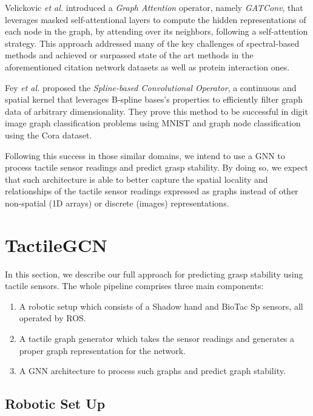 Velickovic \emph{et al.} \cite{Velickovic2017} introduced a \emph{Graph Attention} operator, namely \emph{GATConv}, that leverages masked self-attentional layers to compute the hidden representations of each node in the graph, by attending over its neighbors, following a self-attention strategy. This approach addressed many of the key challenges of spectral-based methods and achieved or surpassed state of the art methods in the aforementioned citation network datasets as well as protein interaction ones.

Fey \emph{et al.} \cite{Fey2018} proposed the \emph{Spline-based Convolutional Operator}, a continuous and spatial kernel that leverages B-spline bases's properties to efficiently filter graph data of arbitrary dimensionality. They prove this method to be successful in digit image graph classification problems using \acs{MNIST} and graph node classification using the Cora dataset.

Following this success in those similar domains, we intend to use a \acs{GNN} to process tactile sensor readings and predict grasp stability. By doing so, we expect that such architecture is able to better capture the spatial locality and relationships of the tactile sensor readings expressed as graphs instead of other non-spatial (\acs{1D} arrays) or discrete (images) representations.

\section{TactileGCN}
\label{cha:tactile:sec:tactilegcn}

In this section, we describe our full approach for predicting grasp stability using tactile sensors. The whole pipeline comprises three main components:

\begin{enumerate}
    \item A robotic setup which consists of a Shadow hand and BioTac Sp sensors, all operated by \ac{ROS}.
    \item A tactile graph generator which takes the sensor readings and generates a proper graph representation for the network.
    \item A \ac{GNN} architecture to process such graphs and predict graph stability.
\end{enumerate}

\subsection{Robotic Set Up}
\label{cha:tactile:sec:tactilegcn:subsec:rpobotic-set-up}


